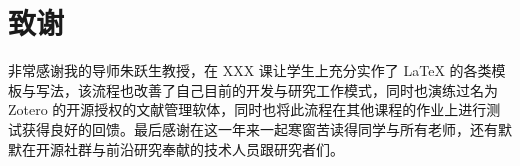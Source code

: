 \chapter{致谢}

非常感谢我的导师朱跃生教授，在 XXX 课让学生上充分实作了 LaTeX 的各类模板与写法，该流程也改善了自己目前的开发与研究工作模式，同时也演练过名为 Zotero 的开源授权的文献管理软体，同时也将此流程在其他课程的作业上进行测试获得良好的回馈。最后感谢在这一年来一起寒窗苦读得同学与所有老师，还有默默在开源社群与前沿研究奉献的技术人员跟研究者们。